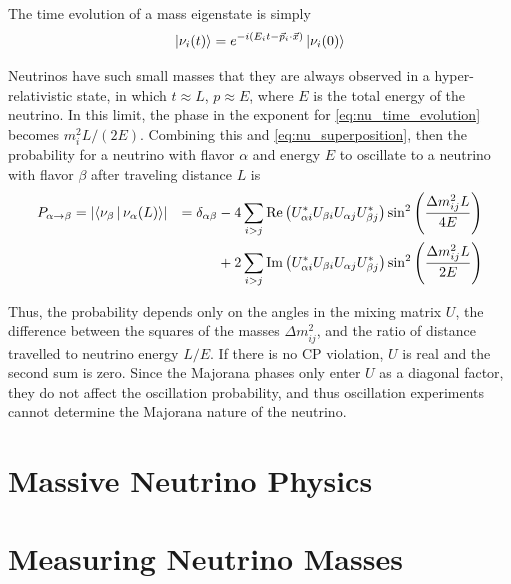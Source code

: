 \documentclass[herrin-thesis.tex]{subfiles}
\begin{document}
 The time evolution of a mass eigenstate is simply
 \begin{equation}
 \Ket{\nu_{i}(t)} = e^{-i(E_i t - \vec{p}_i\cdot\vec{x})}\Ket{\nu_i(0)}
 \label{eq:nu_time_evolution}
 \end{equation}

Neutrinos have such small masses that they are always observed in a hyper-relativistic state, in which \(t\approx L\), \(p\approx E\), where \(E\) is the total energy of the neutrino. In this limit, the phase in the exponent for \cref{eq:nu_time_evolution} becomes \(m_i^2 L/(2E)\). Combining this and \cref{eq:nu_superposition}, then the probability for a neutrino with flavor \(\alpha\) and energy \(E\) to oscillate to a neutrino with flavor \(\beta\) after traveling distance \(L\) is
\begin{align}
P_{\alpha\rightarrow\beta}	& = \left | \Braket{\nu_\beta | \nu_\alpha(L)} \right |	& = \delta_{\alpha\beta}	& - 4\sum_{i>j}\text{Re}\left(U_{\alpha i}^{*}U_{\beta i}U_{\alpha j}U_{\beta j}^{*}\right)\sin^2\left(\frac{\Delta m_{ij}^2 L}{4 E}\right)\nonumber\\
						&										&					& +2\sum_{i>j}\text{Im}\left(U_{\alpha i}^{*}U_{\beta i}U_{\alpha j}U_{\beta j}^{*}\right)\sin^2\left(\frac{\Delta m_{ij}^2 L}{2 E}\right)
\label{eq:nu_oscillation_prob}
\end{align}

Thus, the probability depends only on the angles in the mixing matrix \(U\), the difference between the squares of the masses \(\Delta m_{ij}^2\), and the ratio of distance travelled to neutrino energy \(L/E\). If there is no CP violation, \(U\) is real and the second sum is zero. Since the Majorana phases only enter \(U\) as a diagonal factor, they do not affect the oscillation probability, and thus oscillation experiments cannot determine the Majorana nature of the neutrino.

\section{Massive Neutrino Physics}

\section{Measuring Neutrino Masses}
\end{document}
